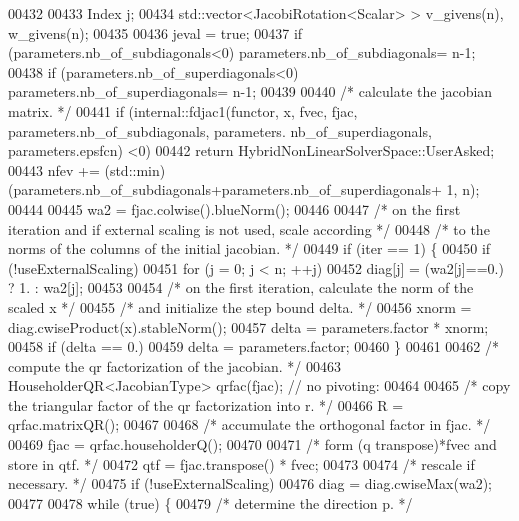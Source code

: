 \begin{DoxyCode}
00432 
00433     Index j;
00434     std::vector<JacobiRotation<Scalar> > v\_givens(n), w\_givens(n);
00435 
00436     jeval = \textcolor{keyword}{true};
00437     \textcolor{keywordflow}{if} (parameters.nb\_of\_subdiagonals<0) parameters.nb\_of\_subdiagonals= n-1;
00438     \textcolor{keywordflow}{if} (parameters.nb\_of\_superdiagonals<0) parameters.nb\_of\_superdiagonals= n-1;
00439 
00440     \textcolor{comment}{/* calculate the jacobian matrix. */}
00441     \textcolor{keywordflow}{if} (internal::fdjac1(functor, x, fvec, fjac, parameters.nb\_of\_subdiagonals, parameters.
      nb\_of\_superdiagonals, parameters.epsfcn) <0)
00442         \textcolor{keywordflow}{return} HybridNonLinearSolverSpace::UserAsked;
00443     nfev += (std::min)(parameters.nb\_of\_subdiagonals+parameters.nb\_of\_superdiagonals+ 1, n);
00444 
00445     wa2 = fjac.colwise().blueNorm();
00446 
00447     \textcolor{comment}{/* on the first iteration and if external scaling is not used, scale according */}
00448     \textcolor{comment}{/* to the norms of the columns of the initial jacobian. */}
00449     \textcolor{keywordflow}{if} (iter == 1) \{
00450         \textcolor{keywordflow}{if} (!useExternalScaling)
00451             \textcolor{keywordflow}{for} (j = 0; j < n; ++j)
00452                 diag[j] = (wa2[j]==0.) ? 1. : wa2[j];
00453 
00454         \textcolor{comment}{/* on the first iteration, calculate the norm of the scaled x */}
00455         \textcolor{comment}{/* and initialize the step bound delta. */}
00456         xnorm = diag.cwiseProduct(x).stableNorm();
00457         delta = parameters.factor * xnorm;
00458         \textcolor{keywordflow}{if} (delta == 0.)
00459             delta = parameters.factor;
00460     \}
00461 
00462     \textcolor{comment}{/* compute the qr factorization of the jacobian. */}
00463     HouseholderQR<JacobianType> qrfac(fjac); \textcolor{comment}{// no pivoting:}
00464 
00465     \textcolor{comment}{/* copy the triangular factor of the qr factorization into r. */}
00466     R = qrfac.matrixQR();
00467 
00468     \textcolor{comment}{/* accumulate the orthogonal factor in fjac. */}
00469     fjac = qrfac.householderQ();
00470 
00471     \textcolor{comment}{/* form (q transpose)*fvec and store in qtf. */}
00472     qtf = fjac.transpose() * fvec;
00473 
00474     \textcolor{comment}{/* rescale if necessary. */}
00475     \textcolor{keywordflow}{if} (!useExternalScaling)
00476         diag = diag.cwiseMax(wa2);
00477 
00478     \textcolor{keywordflow}{while} (\textcolor{keyword}{true}) \{
00479         \textcolor{comment}{/* determine the direction p. */}

\end{DoxyCode}

